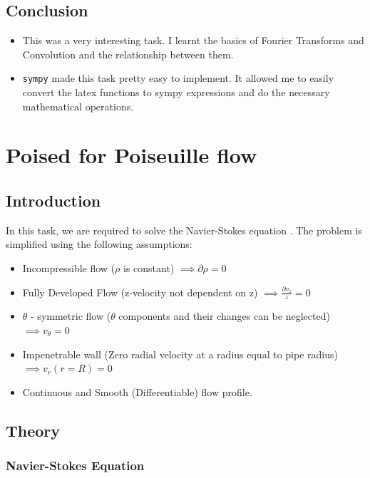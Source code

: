 \documentclass[12pt]{report}
\begin{document}
\section{Conclusion}

\begin{itemize}
    \item This was a very interesting task. I learnt the basics of Fourier Transforms and Convolution and the relationship between them.
    \item \texttt{sympy} made this task pretty easy to implement. It allowed me to easily convert the latex functions to sympy expressions and do the necessary mathematical operations.
\end{itemize}

\newpage

\chapter{Poised for Poiseuille flow}

\section{Introduction}

In this task, we are required to solve the Navier-Stokes equation \cite{enwiki:Navier-Stokes}. The problem is simplified using the following assumptions:

\begin{itemize}
    \item Incompressible flow ($\rho$ is constant) $\implies \partial \rho = 0$
    \item Fully Developed Flow (z-velocity not dependent on z) $\implies \frac{\partial v_z}{z} = 0$
    \item $\theta$ - symmetric flow ($\theta$ components and their changes can be neglected) $\implies v_\theta = 0$
    \item Impenetrable wall (Zero radial velocity at a radius equal to pipe radius) $\implies v_r(r=R) = 0$
    \item Continuous and Smooth (Differentiable) flow profile.
\end{itemize}

\section{Theory}

\subsection{Navier-Stokes Equation}
\end{document}
